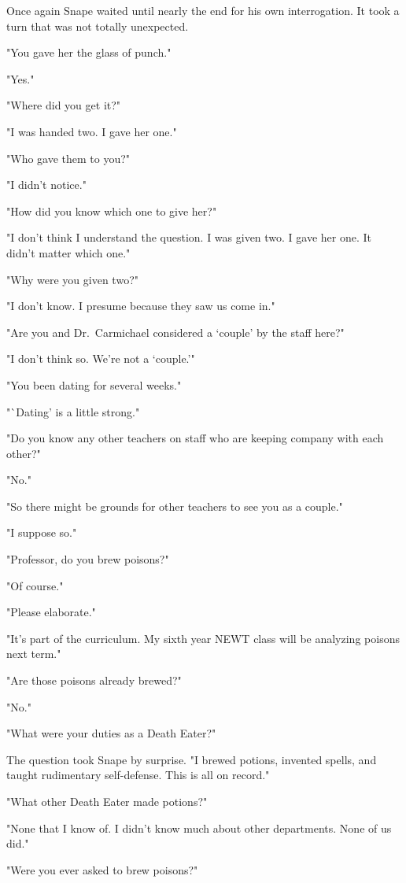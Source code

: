 Once again Snape waited until nearly the end for his own interrogation. It took a turn that was not totally unexpected.

"You gave her the glass of punch."

"Yes."

"Where did you get it?"

"I was handed two. I gave her one."

"Who gave them to you?"

"I didn't notice."

"How did you know which one to give her?"

"I don't think I understand the question. I was given two. I gave her one. It didn't matter which one."

"Why were you given two?"

"I don't know. I presume because they saw us come in."

"Are you and Dr.~Carmichael considered a `couple' by the staff here?"

"I don't think so. We're not a `couple.'"

"You been dating for several weeks."

"`Dating' is a little strong."

"Do you know any other teachers on staff who are keeping company with each other?"

"No."

"So there might be grounds for other teachers to see you as a couple."

"I suppose so."

"Professor, do you brew poisons?"

"Of course."

"Please elaborate."

"It's part of the curriculum. My sixth year NEWT class will be analyzing poisons next term."

"Are those poisons already brewed?"

"No."

"What were your duties as a Death Eater?"

The question took Snape by surprise. "I brewed potions, invented spells, and taught rudimentary self-defense. This is all on record."

"What other Death Eater made potions?"

"None that I know of. I didn't know much about other departments. None of us did."

"Were you ever asked to brew poisons?"


